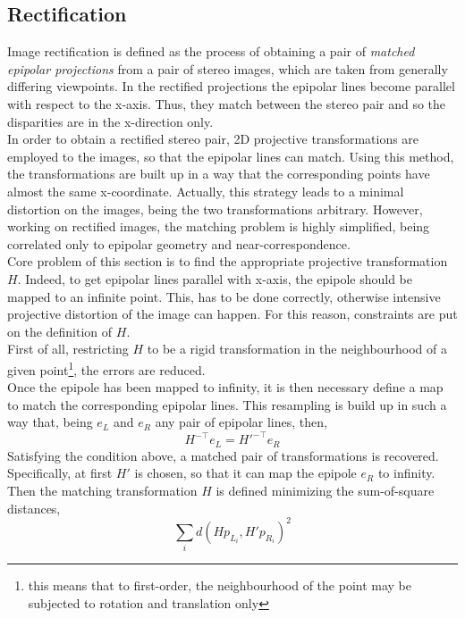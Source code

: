 \subsection{Rectification}
\label{subsec:rectification}

Image rectification is defined as the process of obtaining a pair of \textit{matched epipolar projections} from a pair of stereo images, which are taken from generally differing viewpoints.
In the rectified projections the epipolar lines become parallel with respect to the x-axis. 
Thus, they match between the stereo pair and so the disparities are in the x-direction only.\\
In order to obtain a rectified stereo pair, 2D projective transformations are employed to the images, so that the epipolar lines can match.
Using this method, the transformations are built up in a way that the corresponding points have almost the same x-coordinate.
Actually, this strategy leads to a minimal distortion on the images, being the two transformations arbitrary. 
However, working on rectified images, the matching problem is highly simplified, being correlated only to epipolar geometry and near-correspondence. \\
Core problem of this section is to find the appropriate projective transformation $H$. 
Indeed, to get epipolar lines parallel with x-axis, the epipole should be mapped to an infinite point. 
This, has to be done correctly, otherwise intensive projective distortion of the image can happen.
For this reason, constraints are put on the definition of $H$.\\
First of all, restricting $H$ to be a rigid transformation in the neighbourhood of a given point\footnote{this means that to first-order, the neighbourhood of the point may be subjected to rotation and translation only}, the errors are reduced.\\
Once the epipole has been mapped to infinity, it is then necessary define a map to match the corresponding epipolar lines.
This resampling is build up in such a way that, being $e_L$ and $e_R$ any pair of epipolar lines, then,
\begin{equation}
	H^{-\top} e_L = H'^{-\top} e_R
\end{equation}
Satisfying the condition above, a matched pair of transformations is recovered.\\
Specifically, at first $H'$ is chosen, so that it can map the epipole $e_R$ to infinity. 
Then the matching transformation $H$ is defined minimizing the sum-of-square distances,
\begin{equation}\label{eqn:matchtransfconstr}
	\sum_i d(H p_{L_i}, H'p_{R_i})^2
\end{equation}

